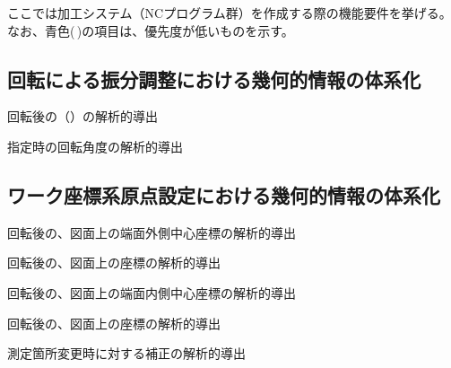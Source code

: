 

ここでは加工システム（NCプログラム群）を作成する際の機能要件を挙げる。
なお、青色(\,\sarrow\!)の項目は、優先度が低いものを示す。




\subsection{\Table 回転による振分調整における幾何的情報の体系化}
\begin{enumerate}[label={\sarrow[red]}]
\item \Table 回転後の\AlocationLength（\ReAlocationLength）の解析的導出
\item \ReAlocationLength 指定時の\Table 回転角度の解析的導出
\end{enumerate}


\subsection{ワーク座標系原点設定における幾何的情報の体系化}
\begin{enumerate}[label={\sarrow[red]}]
\item \Table 回転後の、図面上の端面外側中心座標の解析的導出
\item \Table 回転後の、図面上の\OutcutCenter 座標の解析的導出
\item \Table 回転後の、図面上の端面内側中心座標の解析的導出
\item \Table 回転後の、図面上の\KeywayCenter 座標の解析的導出
\item 測定箇所変更時に対する補正の解析的導出
\end{enumerate}


